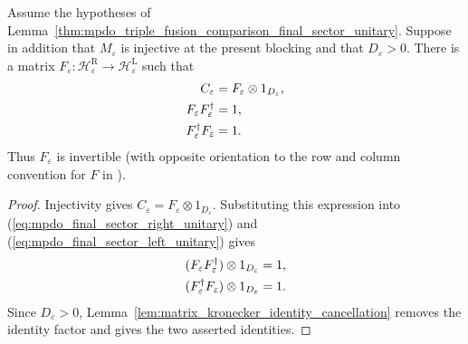 \begin{lemma}%
    \label{thm:mpdo_triple_fusion_multiplicity_unitary}
    \leanok
    Assume the hypotheses of
    Lemma~\ref{thm:mpdo_triple_fusion_comparison_final_sector_unitary}.
    Suppose in addition that $M_\varepsilon$ is injective at the present
    blocking and that $D_\varepsilon>0$. There is a matrix
    $F_\varepsilon:\mathcal H^{\mathrm R}_{\varepsilon}
        \to\mathcal H^{\mathrm L}_{\varepsilon}$ such that
    \begin{align}
        C_\varepsilon
         & =F_\varepsilon\otimes1_{D_\varepsilon},
        \notag                                     \\
        F_\varepsilon F_\varepsilon^\dagger
         & =1,
        \notag                                     \\
        F_\varepsilon^\dagger F_\varepsilon
         & =1.
        \notag
    \end{align}
    Thus $F_\varepsilon$ is invertible (with opposite orientation to the
    row and column convention for $F$ in
    \cite[Section~3.4]{Bultinck2017Anyons}).
\end{lemma}
\begin{proof}\leanok
    Injectivity gives
    $C_\varepsilon=F_\varepsilon\otimes1_{D_\varepsilon}$.
    Substituting this expression into
    (\ref{eq:mpdo_final_sector_right_unitary}) and
    (\ref{eq:mpdo_final_sector_left_unitary}) gives
    \begin{align}
        (F_\varepsilon F_\varepsilon^\dagger)
        \otimes1_{D_\varepsilon}
         & =1,
        \notag \\
        (F_\varepsilon^\dagger F_\varepsilon)
        \otimes1_{D_\varepsilon}
         & =1.
        \notag
    \end{align}
    Since $D_\varepsilon>0$, Lemma~\ref{lem:matrix_kronecker_identity_cancellation}
    removes the identity factor and gives the two asserted identities.
\end{proof}


